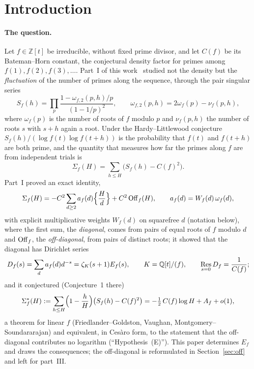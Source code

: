 \documentclass[11pt,a4paper]{article}
\theoremstyle{remark}\newtheorem{remark}[theorem]{Remark}
\newcommand{\Z}{\mathbb{Z}}\newcommand{\Q}{\mathbb{Q}}\newcommand{\F}{\mathbb{F}}\newcommand{\C}{\mathbb{C}}
\begin{document}
\section{Introduction}\label{sec:intro}

\paragraph{The question.} Let $f\in\Z[t]$ be irreducible, without fixed prime divisor, and let $C(f)$ be its
Bateman--Horn constant, the conjectural density factor for primes among $f(1),f(2),f(3),\dots$. Part~I of
this work~\cite{ReichardtFable2026a} studied not the density but the \emph{fluctuation} of the number of
primes along the sequence, through the pair singular series
\[
S_f(h)=\prod_p\frac{1-\omega_{f,2}(p,h)/p}{(1-1/p)^2},\qquad\omega_{f,2}(p,h)=2\omega_f(p)-\nu_f(p,h),
\]
where $\omega_f(p)$ is the number of roots of $f$ modulo $p$ and $\nu_f(p,h)$ the number of roots $s$ with
$s+h$ again a root. Under the Hardy--Littlewood conjecture $S_f(h)/(\log f(t)\log f(t+h))$ is the probability
that $f(t)$ and $f(t+h)$ are both prime, and the quantity that measures how far the primes along $f$ are from
independent trials is
\begin{equation}\label{eq:Sigma}
\Sigma_f(H)=\sum_{h\le H}\bigl(S_f(h)-C(f)^2\bigr).
\end{equation}
Part~I proved an exact identity,
\begin{equation}\label{eq:split}
\Sigma_f(H)=-C^2\sum_{d\ge2}a_f(d)\Bigl\{\frac Hd\Bigr\}+C^2\,\mathrm{Off}_f(H),\qquad a_f(d)=W_f(d)\,\omega_f(d),
\end{equation}
with explicit multiplicative weights $W_f(d)$ on squarefree $d$ (notation below), where the first sum, the
\emph{diagonal}, comes from pairs of equal roots of $f$ modulo $d$ and $\mathrm{Off}_f$, the \emph{off-diagonal}, from
pairs of distinct roots; it showed that the diagonal has Dirichlet series
\[
D_f(s)=\sum_da_f(d)d^{-s}=\zeta_K(s+1)E_f(s),\qquad K=\Q[t]/(f),\qquad\Res_{s=0}D_f=\frac1{C(f)};
\]
and it conjectured (Conjecture~1 there)
\begin{equation}\label{eq:conj}
\Sigma^\ast_f(H):=\sum_{h\le H}\Bigl(1-\frac hH\Bigr)\bigl(S_f(h)-C(f)^2\bigr)=-\tfrac12\,C(f)\log H+A_f+o(1),
\end{equation}
a theorem for linear $f$ (Friedlander--Goldston, Vaughan, Montgomery--Soundararajan) and equivalent, in
Ces\`aro form, to the statement that the off-diagonal contributes no logarithm (``Hypothesis~(E)''). This
paper determines $E_f$ and draws the consequences; the off-diagonal is reformulated in
Section~\ref{sec:off} and left for part~III.
\end{document}
